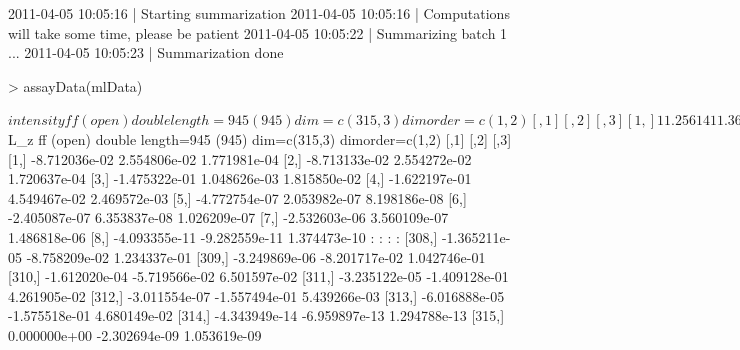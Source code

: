 \documentclass[article]{bioinf}
\begin{document}
\begin{Schunk}
\begin{Soutput}
2011-04-05 10:05:16 |   Starting summarization 
2011-04-05 10:05:16 |   Computations will take some time, please be patient 
2011-04-05 10:05:22 |   Summarizing batch 1 ... 
2011-04-05 10:05:23 |   Summarization done 
\end{Soutput}
\begin{Sinput}
> assayData(mlData)
\end{Sinput}
\begin{Soutput}
$intensity
ff (open) double length=945 (945) dim=c(315,3) dimorder=c(1,2)
           [,1]     [,2]     [,3]
[1,]   11.25614 11.36881 11.34344
[2,]   11.17581 11.28848 11.26311
[3,]   11.31831 11.46689 11.48400
[4,]   11.43798 11.64570 11.60267
[5,]   11.56560 11.56560 11.56560
[6,]   11.67900 11.67900 11.67900
[7,]   11.75993 11.75994 11.75994
[8,]   11.98562 11.98562 11.98562
:             :        :        :
[308,] 12.45345 12.36589 12.57690
[309,] 12.63058 12.54857 12.73486
[310,] 12.37031 12.31327 12.43549
[311,] 12.50302 12.36214 12.54567
[312,] 12.37075 12.21500 12.37619
[313,] 12.38909 12.23160 12.43595
[314,] 12.17181 12.17181 12.17181
[315,] 12.46419 12.46419 12.46419

$L_z
ff (open) double length=945 (945) dim=c(315,3) dimorder=c(1,2)
                [,1]          [,2]          [,3]
[1,]   -8.712036e-02  2.554806e-02  1.771981e-04
[2,]   -8.713133e-02  2.554272e-02  1.720637e-04
[3,]   -1.475322e-01  1.048626e-03  1.815850e-02
[4,]   -1.622197e-01  4.549467e-02  2.469572e-03
[5,]   -4.772754e-07  2.053982e-07  8.198186e-08
[6,]   -2.405087e-07  6.353837e-08  1.026209e-07
[7,]   -2.532603e-06  3.560109e-07  1.486818e-06
[8,]   -4.093355e-11 -9.282559e-11  1.374473e-10
:                  :             :             :
[308,] -1.365211e-05 -8.758209e-02  1.234337e-01
[309,] -3.249869e-06 -8.201717e-02  1.042746e-01
[310,] -1.612020e-04 -5.719566e-02  6.501597e-02
[311,] -3.235122e-05 -1.409128e-01  4.261905e-02
[312,] -3.011554e-07 -1.557494e-01  5.439266e-03
[313,] -6.016888e-05 -1.575518e-01  4.680149e-02
[314,] -4.343949e-14 -6.959897e-13  1.294788e-13
[315,]  0.000000e+00 -2.302694e-09  1.053619e-09


\end{Soutput}
\end{Schunk}
\end{document}
